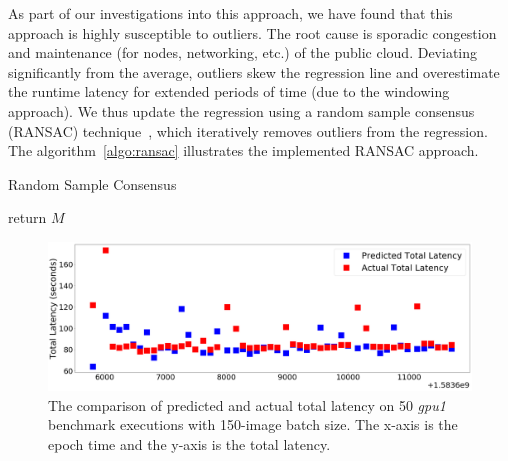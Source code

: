 As part of our investigations into this approach, we have found that this approach is highly susceptible to outliers. The root cause is sporadic congestion and maintenance (for nodes, networking, etc.) of the public cloud. Deviating significantly from the average, outliers skew the regression line and overestimate the runtime latency for extended periods of time (due to the windowing approach). We thus update the regression using a random sample consensus (RANSAC) technique~\cite{ref:ransac}, which iteratively removes outliers from the regression. The algorithm~\ref{algo:ransac} illustrates the implemented RANSAC approach.

\begin{algorithm}[]
\caption{Random Sample Consensus}
\label{algo:ransac}
\SetAlgoLined
{}
 return $M$
\end{algorithm}
 
 \begin{figure}
    \centering
    \includegraphics[scale=0.12]{figures/timeline.png}
    \caption{The comparison of predicted and actual total latency on 50 \textit{gpu1} benchmark executions with 150-image batch size. The x-axis is the epoch time and the y-axis is the total latency. \label{fig:timeline}}
\end{figure}

